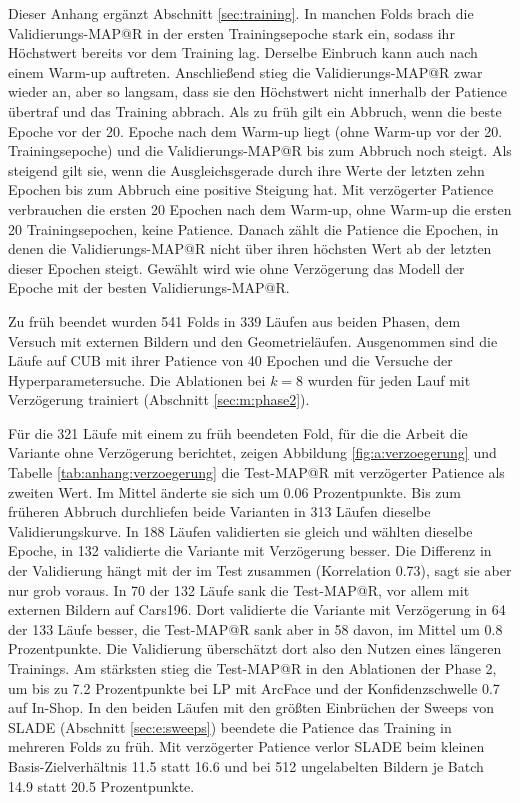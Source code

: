 Dieser Anhang ergänzt Abschnitt \ref{sec:training}. In manchen Folds brach die Validierungs-\ac{MAP@R} in der ersten Trainingsepoche stark ein, sodass ihr Höchstwert bereits vor dem Training lag. Derselbe Einbruch kann auch nach einem Warm-up auftreten. Anschließend stieg die Validierungs-\ac{MAP@R} zwar wieder an, aber so langsam, dass sie den Höchstwert nicht innerhalb der Patience übertraf und das Training abbrach. Als zu früh gilt ein Abbruch, wenn die beste Epoche vor der 20. Epoche nach dem Warm-up liegt (ohne Warm-up vor der 20. Trainingsepoche) und die Validierungs-\ac{MAP@R} bis zum Abbruch noch steigt. Als steigend gilt sie, wenn die Ausgleichsgerade durch ihre Werte der letzten zehn Epochen bis zum Abbruch eine positive Steigung hat. Mit verzögerter Patience verbrauchen die ersten 20 Epochen nach dem Warm-up, ohne Warm-up die ersten 20 Trainingsepochen, keine Patience. Danach zählt die Patience die Epochen, in denen die Validierungs-\ac{MAP@R} nicht über ihren höchsten Wert ab der letzten dieser Epochen steigt. Gewählt wird wie ohne Verzögerung das Modell der Epoche mit der besten Validierungs-\ac{MAP@R}.

Zu früh beendet wurden 541 Folds in 339 Läufen aus beiden Phasen, dem Versuch mit externen Bildern und den Geometrieläufen. Ausgenommen sind die Läufe auf \ac{CUB} mit ihrer Patience von 40 Epochen und die Versuche der Hyperparametersuche. Die Ablationen bei $k=8$ wurden für jeden Lauf mit Verzögerung trainiert (Abschnitt \ref{sec:m:phase2}).

Für die 321 Läufe mit einem zu früh beendeten Fold, für die die Arbeit die Variante ohne Verzögerung berichtet, zeigen Abbildung \ref{fig:a:verzoegerung} und Tabelle \ref{tab:anhang:verzoegerung} die Test-\ac{MAP@R} mit verzögerter Patience als zweiten Wert. Im Mittel änderte sie sich um \num{0.06} Prozentpunkte. Bis zum früheren Abbruch durchliefen beide Varianten in 313 Läufen dieselbe Validierungskurve. In 188 Läufen validierten sie gleich und wählten dieselbe Epoche, in 132 validierte die Variante mit Verzögerung besser. Die Differenz in der Validierung hängt mit der im Test zusammen (Korrelation \num{0.73}), sagt sie aber nur grob voraus. In 70 der 132 Läufe sank die Test-\ac{MAP@R}, vor allem mit externen Bildern auf Cars196. Dort validierte die Variante mit Verzögerung in 64 der 133 Läufe besser, die Test-\ac{MAP@R} sank aber in 58 davon, im Mittel um \num{0.8} Prozentpunkte. Die Validierung überschätzt dort also den Nutzen eines längeren Trainings. Am stärksten stieg die Test-\ac{MAP@R} in den Ablationen der Phase 2, um bis zu \num{7.2} Prozentpunkte bei \ac{LP} mit ArcFace und der Konfidenzschwelle \num{0.7} auf In-Shop. In den beiden Läufen mit den größten Einbrüchen der Sweeps von \ac{SLADE} (Abschnitt \ref{sec:e:sweeps}) beendete die Patience das Training in mehreren Folds zu früh. Mit verzögerter Patience verlor \ac{SLADE} beim kleinen Basis-Zielverhältnis \num{11.5} statt \num{16.6} und bei 512 ungelabelten Bildern je Batch \num{14.9} statt \num{20.5} Prozentpunkte.

